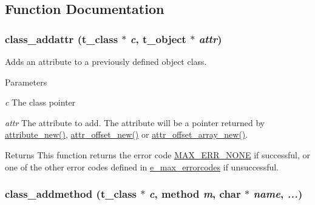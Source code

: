 \subsection{Function Documentation}
\hypertarget{group__class_ga2289eb7e26b552be6e015c2f9912a9ac}{
\subsubsection[{class\_\-addattr}]{ class\_\-addattr ({\bf t\_\-class} $\ast$ {\em c}, \/  {\bf t\_\-object} $\ast$ {\em attr})}}
\label{group__class_ga2289eb7e26b552be6e015c2f9912a9ac}


Adds an attribute to a previously defined object class. 
\begin{DoxyParams}{Parameters}
\item[{\em c}]The class pointer \item[{\em attr}]The attribute to add. The attribute will be a pointer returned by \hyperlink{group__attr_ga24badeb31a79d844935b2a1c8423c905}{attribute\_\-new()}, \hyperlink{group__attr_ga089ad1af7af1d0771b4a4e1417d16779}{attr\_\-offset\_\-new()} or \hyperlink{group__attr_ga3828e337f808838f30599ae6bf01fdb9}{attr\_\-offset\_\-array\_\-new()}.\end{DoxyParams}
\begin{DoxyReturn}{Returns}
This function returns the error code \hyperlink{group__misc_gga0764dd6c02b76cca7d053ae50555d69da6d22f77fef8b1e1b074cef5d29d935fd}{MAX\_\-ERR\_\-NONE} if successful, or one of the other error codes defined in \hyperlink{group__misc_ga0764dd6c02b76cca7d053ae50555d69d}{e\_\-max\_\-errorcodes} if unsuccessful. 
\end{DoxyReturn}
\hypertarget{group__class_ga1fabf54e0cec8d4e5f732fa347b3f874}{
\subsubsection[{class\_\-addmethod}]{ class\_\-addmethod ({\bf t\_\-class} $\ast$ {\em c}, \/  {\bf method} {\em m}, \/  char $\ast$ {\em name}, \/   {\em ...})}}
\label{group__class_ga1fabf54e0cec8d4e5f732fa347b3f874}


